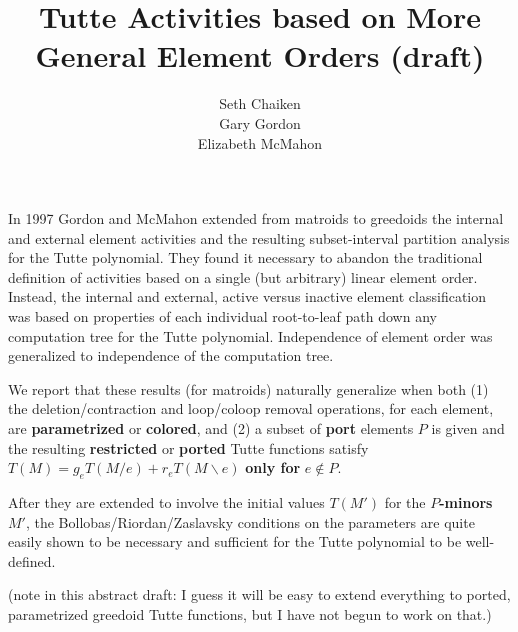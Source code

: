 \documentclass{article}
\title{Tutte Activities based on More General Element Orders (draft)}
\author{Seth Chaiken\\
Gary Gordon\\
Elizabeth McMahon}
\begin{document}
\maketitle
In 1997 Gordon and McMahon\cite{GordonMcMachonGreedoid} 
extended from matroids to greedoids
the internal and external 
element activities and the resulting subset-interval 
partition analysis for the Tutte polynomial.  They found it necessary
to abandon the traditional definition of activities based on a 
single (but arbitrary) linear element order.  Instead, the internal and 
external, active versus inactive element classification was based on 
properties of each individual root-to-leaf path down any computation tree
for the Tutte polynomial.  Independence of element order was generalized to
independence of the computation tree.

We report that these results (for matroids) naturally generalize when both (1) 
the deletion/contraction and loop/coloop removal operations, for each element,
are \textbf{parametrized} or 
\textbf{colored}, and (2) a subset of \textbf{port} elements 
$P$ is given and the resulting \textbf{restricted} or \textbf{ported}
Tutte functions satisfy $T(M) = g_e T(M/e) + r_e T(M\backslash e)$ 
\textbf{only for} $e\not\in P$.

After they are extended to involve the initial values $T(M')$ for 
the \textbf{$P$-minors} $M'$, the Bollobas/Riordan/Zaslavsky 
conditions on the parameters are quite easily 
shown to be necessary and sufficient for the Tutte polynomial to be
well-defined.

(note in this abstract draft: I guess it will be easy to extend everything
to ported, parametrized greedoid Tutte functions, but I have not 
begun to work on that.)




\end{document}
